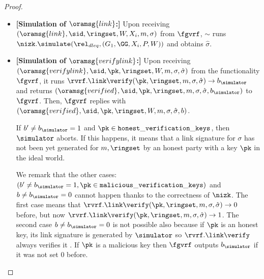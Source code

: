 \begin{proof}
\begin{itemize}
\begin{itemize}
		\end{itemize}
		
		
		
		
		
		\item \textbf{[Simulation of $ \oramsg{link} $:]} Upon receiving $(\oramsg{link}, \sid, \ringset, W,X_i, m,  \sigma)$ from $\fgvrf$, $ \sim $ runs $ \nizk.\simulate(\rel_{dleq}, (G_1, \GG,X_i, P,W)) $ and obtains $ \hat{\sigma} $.
		
		
		
		\item \textbf{[Simulation of $ \oramsg{verifylink} $:]} Upon receiving  $(\oramsg{verifylink}, \sid, \pk, \ringset, W,m, \sigma, \hat \sigma)$ from the functionality $\fgvrf$,  it runs $ \rvrf.\link\verify(\pk,\ringset, m, \sigma,\hat \sigma) \rightarrow b_\simulator $ and  returns $ (\oramsg{verified}, \sid, \pk,\ringset, m, \sigma, \hat\sigma, b_\simulator) $ to  $\fgvrf  $. Then, $ \fgvrf $ replies with $ (\oramsg{verified}, \sid, \pk,\ringset,W, m, \sigma, \hat\sigma, b) $. 
		
		If $ b' \neq b_\simulator   = 1 $ and $ \pk \in \mathtt{honest\_verification\_keys} $, then $ \simulator $ aborts. If this happens, it means that a link signature for $ \sigma $ has not been yet generated for $ m, \ringset $ by an honest party with a key $ \pk $ in the ideal world.
		
		We remark that the other cases:   $ (b' \neq b_\simulator   = 1, \pk \in \mathtt{malicious\_verification\_keys})$ and  $ b \neq b_\simulator = 0 $ cannot happen thanks to  the correctness of $ \nizk $. The first case  means that $ \rvrf.\link\verify(\pk,\ringset, m, \sigma,\hat \sigma) \rightarrow 0$ before, but now $  \rvrf.\link\verify(\pk,\ringset, m, \sigma,\hat \sigma) \rightarrow 1 $.  
		The second case $ b \neq b_\simulator = 0 $ is not possible also because if $ \pk $ is an honest key, its link signature is generated by $ \simulator $ so $ \rvrf.\link\verify $ always verifies it . If $ \pk $ is a malicious key then $ \fgvrf $ outputs  $ b_\simulator $ if it was not set 0 before. 
		

\end{itemize}
\end{proof}
